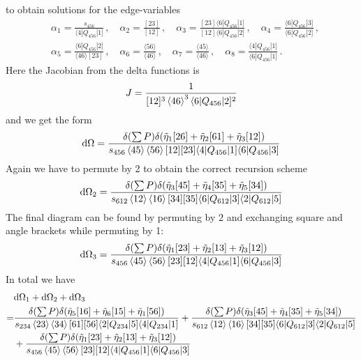 \documentclass[letter,11pt]{article}
\newcommand{\ab}[1]{\langle #1 \rangle}
\newcommand{\aMs}[3]{\langle #1|#2|#3]}  		%
\newcommand{\sab}[1]{s_{#1}}
\begin{document}
to obtain solutions for the edge-variables
\begin{equation}
	\begin{aligned}
			& \alpha_1 = \frac{\sab{456}}{\aMs{4}{Q_{456}}{1}}\,, \quad \alpha_2 = \frac{[23]}{[12]}\,, \quad \alpha_3 = \frac{[23]\aMs{6}{Q_{456}}{1}}{[12]\aMs{6}{Q_{456}}{2}}\,, \quad \alpha_4 = \frac{\aMs{6}{Q_{456}}{3}}{\aMs{6}{Q_{456}}{2}}\,,\\ 
		&\alpha_5 = \frac{\aMs{6}{Q_{456}}{2}}{\ab{46}[23]}\,, 
		 \quad
		\alpha_6 = \frac{\ab{56}}{\ab{46}}\,,\quad \alpha_7 = \frac{\ab{45}}{\ab{46}}\,,\quad
		\alpha_8 =  \frac{\aMs{4}{Q_{456}}{1}}{\aMs{6}{Q_{456}}{1}}\,.
	\end{aligned}
\end{equation}
Here the Jacobian from the delta functions is
\begin{equation}
	\begin{aligned}
		J=\frac{1}{[12]^3\expval{46}^3\aMs{6}{Q_{456}}{2}^2}
	\end{aligned}
\end{equation}
and we get the form
\begin{equation}
	\begin{aligned}
		\dd \Omega=\frac{\delta(\sum P)\delta(\tilde\eta_1[26]+\tilde\eta_2[61]+\tilde\eta_3[12])}{s_{456}\expval{45}\expval{56}[12][23]\aMs{4}{Q_{456}}{1}\aMs{6}{Q_{456}}{3}}
	\end{aligned}
\end{equation}
Again we have to permute by 2 to obtain the correct recursion scheme
\begin{equation}
	\begin{aligned}
		\dd \Omega_2=\frac{\delta(\sum P)\delta(\tilde\eta_3[45]+\tilde\eta_4[35]+\tilde\eta_5[34])}{s_{612}\expval{12}\expval{16}[34][35]\aMs{6}{Q_{612}}{3}\aMs{2}{Q_{612}}{5}}
	\end{aligned}
\end{equation}
The final diagram can be found by permuting by $2$ and exchanging square and angle brackets while permuting by 1:
\begin{equation}
	\begin{aligned}
		\dd \Omega_3=\frac{\delta(\sum P)\delta(\tilde\eta_1[23]+\tilde\eta_2[13]+\tilde\eta_3[12])}{s_{456}\expval{45}\expval{56}[23][12]\aMs{4}{Q_{456}}{1}\aMs{6}{Q_{456}}{3}}
	\end{aligned}
\end{equation}
In total we have
\begin{equation}
	\begin{aligned}
		&\dd \Omega_1 +\dd \Omega_2+\dd \Omega_3\\
		=&\frac{\delta(\sum P)\delta(\tilde\eta_5[16]+\tilde\eta_6[15]+\tilde\eta_1[56])}{s_{234}\expval{23}\expval{34}[61][56]\aMs{2}{Q_{234}}{5}\aMs{4}{Q_{234}}{1}}
		+\frac{\delta(\sum P)\delta(\tilde\eta_3[45]+\tilde\eta_4[35]+\tilde\eta_5[34])}{s_{612}\expval{12}\expval{16}[34][35]\aMs{6}{Q_{612}}{3}\aMs{2}{Q_{612}}{5}}
		\\&+\frac{\delta(\sum P)\delta(\tilde\eta_1[23]+\tilde\eta_2[13]+\tilde\eta_3[12])}{s_{456}\expval{45}\expval{56}[23][12]\aMs{4}{Q_{456}}{1}\aMs{6}{Q_{456}}{3}}
	\end{aligned}
\end{equation}
\end{document}
